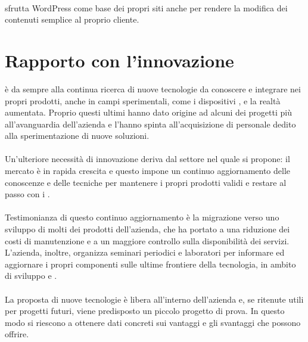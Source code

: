    \paragraph*{}
   \nomeAzienda{} sfrutta WordPress come base dei propri siti anche per rendere la modifica dei contenuti semplice al proprio cliente.

\section{Rapporto con l'innovazione}
\nomeAzienda{} è da sempre alla continua ricerca di nuove tecnologie da conoscere e integrare nei propri prodotti, anche in campi sperimentali, come i dispositivi ,  e la realtà aumentata. Proprio questi ultimi hanno dato origine ad alcuni dei progetti più all'avanguardia dell'azienda e l'hanno spinta all'acquisizione di personale dedito alla sperimentazione di nuove soluzioni.
\paragraph*{}
Un'ulteriore necessità di innovazione deriva dal settore nel quale \nomeAzienda{} si propone: il mercato è in rapida crescita e questo impone un continuo aggiornamento delle conoscenze e delle tecniche per mantenere i propri prodotti validi e restare al passo con i .
\paragraph*{}
Testimonianza di questo continuo aggiornamento è la migrazione verso uno sviluppo   di molti dei prodotti dell'azienda, che ha portato a una riduzione dei costi di manutenzione e a un maggiore controllo sulla disponibilità dei servizi. L'azienda, inoltre, organizza seminari periodici e laboratori per informare ed aggiornare i propri componenti sulle ultime frontiere della tecnologia, in ambito di sviluppo e .
\paragraph*{}
La proposta di nuove tecnologie è libera all'interno dell'azienda e, se ritenute utili per progetti futuri, viene predisposto un piccolo progetto di prova. In questo modo si riescono a ottenere dati concreti sui vantaggi e gli svantaggi che possono offrire.
